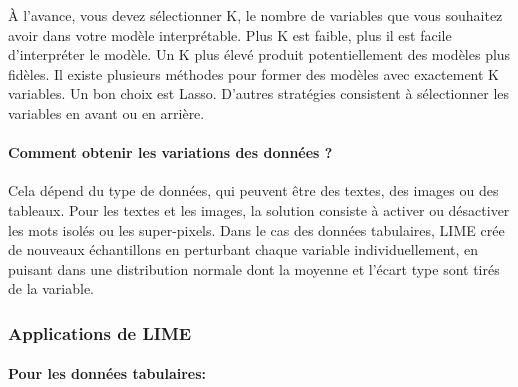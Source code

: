 À l'avance, vous devez sélectionner K, le nombre de variables que vous souhaitez avoir dans votre modèle interprétable. Plus K est faible, plus il est facile d'interpréter le modèle. Un K plus élevé produit potentiellement des modèles plus fidèles. Il existe plusieurs méthodes pour former des modèles avec exactement K variables. Un bon choix est Lasso. D'autres stratégies consistent à sélectionner les variables en avant ou en arrière.

\paragraph{Comment obtenir les variations des données ?} Cela dépend du type de données, qui peuvent être des textes, des images ou des tableaux. Pour les textes et les images, la solution consiste à activer ou désactiver les mots isolés ou les super-pixels. Dans le cas des données tabulaires, LIME crée de nouveaux échantillons en perturbant chaque variable individuellement, en puisant dans une distribution normale dont la moyenne et l'écart type sont tirés de la variable.

\subsubsection{Applications de LIME}

\paragraph{Pour les données tabulaires: }

